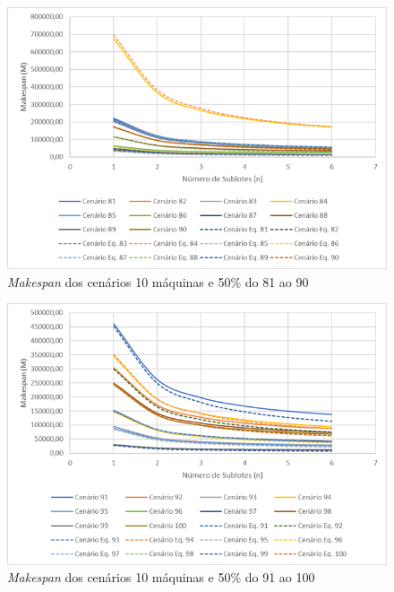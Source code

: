 \begin{figure}[H]
    \centering
     \includegraphics[width=13cm]{Apendices/Figuras/10m50_81-90.png}
     \caption{\textit{Makespan} dos cenários 10 máquinas e 50\% do 81 ao 90}
    \label{fig:10m50_81-90}
\end{figure}

\begin{figure}[H]
    \centering
     \includegraphics[width=13cm]{Apendices/Figuras/10m50_91-100.png}
     \caption{\textit{Makespan} dos cenários 10 máquinas e 50\% do 91 ao 100}
    \label{fig:10m50_91-100}
\end{figure}